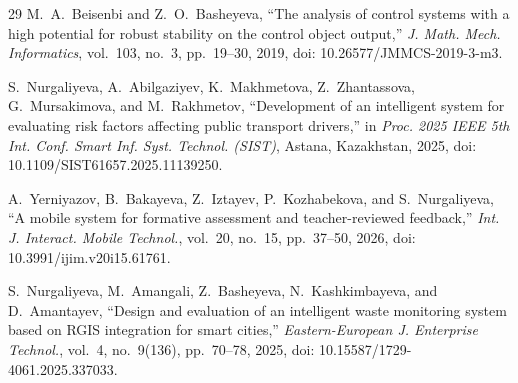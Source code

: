 \documentclass[conference]{IEEEtran}
\begin{document}
\begin{thebibliography}{29}
 M.~A.~Beisenbi and Z.~O.~Basheyeva, ``The analysis of control systems with a high potential for robust stability on the control object output,'' \textit{J. Math. Mech. Informatics}, vol.~103, no.~3, pp.~19--30, 2019, doi: 10.26577/JMMCS-2019-3-m3.

 S.~Nurgaliyeva, A.~Abilgaziyev, K.~Makhmetova, Z.~Zhantassova, G.~Mursakimova, and M.~Rakhmetov, ``Development of an intelligent system for evaluating risk factors affecting public transport drivers,'' in \textit{Proc. 2025 IEEE 5th Int. Conf. Smart Inf. Syst. Technol. (SIST)}, Astana, Kazakhstan, 2025, doi: 10.1109/SIST61657.2025.11139250.

 A.~Yerniyazov, B.~Bakayeva, Z.~Iztayev, P.~Kozhabekova, and S.~Nurgaliyeva, ``A mobile system for formative assessment and teacher-reviewed feedback,'' \textit{Int. J. Interact. Mobile Technol.}, vol.~20, no.~15, pp.~37--50, 2026, doi: 10.3991/ijim.v20i15.61761.

 S.~Nurgaliyeva, M.~Amangali, Z.~Basheyeva, N.~Kashkimbayeva, and D.~Amantayev, ``Design and evaluation of an intelligent waste monitoring system based on RGIS integration for smart cities,'' \textit{Eastern-European J. Enterprise Technol.}, vol.~4, no.~9(136), pp.~70--78, 2025, doi: 10.15587/1729-4061.2025.337033.

\end{thebibliography}
\end{document}
